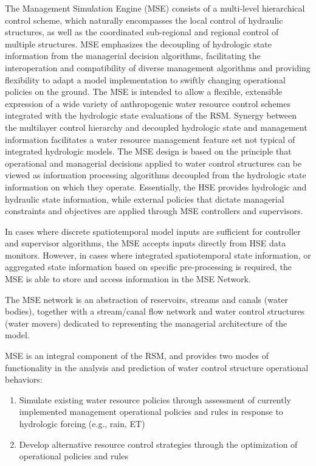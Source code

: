 The Management Simulation Engine (MSE) consists of a multi-level
hierarchical control scheme, which naturally encompasses the local
control of hydraulic structures, as well as the coordinated
sub-regional and regional control of multiple structures. MSE
emphasizes the decoupling of hydrologic state information from the
managerial decision algorithms, facilitating the interoperation and
compatibility of diverse management algorithms and providing
flexibility to adapt a model implementation to swiftly changing
operational policies on the ground. The MSE is intended to allow a
flexible, extensible expression of a wide variety of anthropogenic
water resource control schemes integrated with the hydrologic state
evaluations of the RSM. Synergy between the multilayer control
hierarchy and decoupled hydrologic state and management information
facilitates a water resource management feature set not typical of
integrated hydrologic models.  The MSE design is based on the
principle that operational and managerial decisions applied to water
control structures can be viewed as information processing algorithms
decoupled from the hydrologic state information on which they
operate. Essentially, the HSE provides hydrologic and hydraulic state
information, while external policies that dictate managerial
constraints and objectives are applied through MSE controllers and
supervisors.

In cases where discrete spatiotemporal model inputs are sufficient for
controller and supervisor algorithms, the MSE accepts inputs directly
from HSE data monitors. However, in cases where integrated
spatiotemporal state information, or aggregated state information
based on specific pre-processing is required, the MSE is able to store
and access information in the MSE Network.  

The MSE network is an abstraction of reservoirs, streams and canals
(water bodies), together with a stream/canal flow network and water
control structures (water movers) dedicated to representing the
managerial architecture of the model.

MSE is an integral component of the RSM, and provides two modes of
functionality in the analysis and prediction of water control
structure operational behaviors:

\begin{enumerate}
 \item Simulate existing water resource policies through assessment of
   currently implemented management operational policies and rules in
   response to hydrologic forcing (e.g., rain, ET)
 \item Develop alternative resource control strategies through the
   optimization of operational policies and rules
\end{enumerate}

